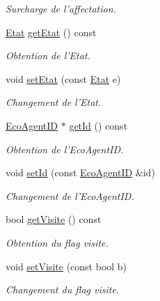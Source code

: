 \begin{CompactItemize}
\begin{CompactList}\small\item\em Surcharge de l'affectation. \item\end{CompactList}\item 
\hyperlink{etat_8hpp_767b7a63d7677f92d697621b4166af1b}{Etat} \hyperlink{classEcoAgent_91160732f8c4dd585ac5d8ad69bf3891}{getEtat} () const 
\begin{CompactList}\small\item\em Obtention de l'Etat. \item\end{CompactList}\item 
void \hyperlink{classEcoAgent_e06a7430bd88705a327cf498c8420a2b}{setEtat} (const \hyperlink{etat_8hpp_767b7a63d7677f92d697621b4166af1b}{Etat} e)
\begin{CompactList}\small\item\em Changement de l'Etat. \item\end{CompactList}\item 
\hyperlink{classEcoAgentID}{EcoAgentID} $\ast$ \hyperlink{classEcoAgent_888101c39bee652681dffcb36bd9bb01}{getId} () const 
\begin{CompactList}\small\item\em Obtention de l'EcoAgentID. \item\end{CompactList}\item 
void \hyperlink{classEcoAgent_ef2dde1272916b9f3a8f5a663bf96f69}{setId} (const \hyperlink{classEcoAgentID}{EcoAgentID} \&id)
\begin{CompactList}\small\item\em Changement de l'EcoAgentID. \item\end{CompactList}\item 
bool \hyperlink{classEcoAgent_8156bc22f2daca635c4f2577e6b96849}{getVisite} () const 
\begin{CompactList}\small\item\em Obtention du flag visite. \item\end{CompactList}\item 
void \hyperlink{classEcoAgent_aa8d25798a3783276c07725bce711120}{setVisite} (const bool b)
\begin{CompactList}\small\item\em Changement du flag visite. \item\end{CompactList}\item 

\end{CompactItemize}
